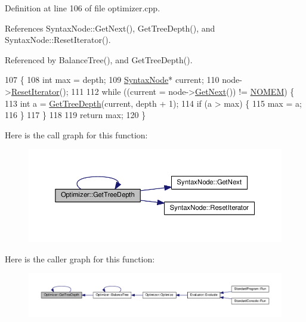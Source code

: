 Definition at line 106 of file optimizer.\+cpp.



References Syntax\+Node\+::\+Get\+Next(), Get\+Tree\+Depth(), and Syntax\+Node\+::\+Reset\+Iterator().



Referenced by Balance\+Tree(), and Get\+Tree\+Depth().


\begin{DoxyCode}
107 \{
108     \textcolor{keywordtype}{int} max = depth;
109     \hyperlink{classSyntaxNode}{SyntaxNode}* current;
110     node->\hyperlink{classSyntaxNode_ac51307368fb255aa760b99e137178c89}{ResetIterator}();
111 
112     \textcolor{keywordflow}{while} ((current = node->\hyperlink{classSyntaxNode_af1fa46ba30aa4f2affa2d4e96a4be010}{GetNext}()) != \hyperlink{platform_8h_a46ff2bfbf0d44b8466a2251d5bd5e6f8}{NOMEM}) \{
113         \textcolor{keywordtype}{int} a = \hyperlink{classOptimizer_a4a80c3e845604f1ea53a6bfc187b2bba}{GetTreeDepth}(current, depth + 1);
114         \textcolor{keywordflow}{if} (a > max) \{
115             max = a;
116         \}
117     \}
118 
119     \textcolor{keywordflow}{return} max;
120 \}
\end{DoxyCode}


Here is the call graph for this function\+:
\nopagebreak
\begin{figure}[H]
\begin{center}
\leavevmode
\includegraphics[width=350pt]{d1/dc4/classOptimizer_a4a80c3e845604f1ea53a6bfc187b2bba_cgraph}
\end{center}
\end{figure}




Here is the caller graph for this function\+:
\nopagebreak
\begin{figure}[H]
\begin{center}
\leavevmode
\includegraphics[width=350pt]{d1/dc4/classOptimizer_a4a80c3e845604f1ea53a6bfc187b2bba_icgraph}
\end{center}
\end{figure}


